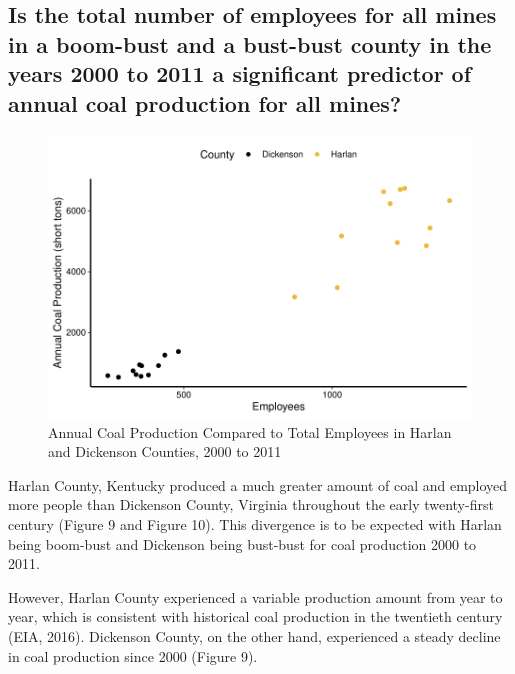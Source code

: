 \documentclass[12pt,]{article}
\begin{document}
\hypertarget{is-the-total-number-of-employees-for-all-mines-in-a-boom-bust-and-a-bust-bust-county-in-the-years-2000-to-2011-a-significant-predictor-of-annual-coal-production-for-all-mines}{%
\subsection{Is the total number of employees for all mines in a
boom-bust and a bust-bust county in the years 2000 to 2011 a significant
predictor of annual coal production for all
mines?}\label{is-the-total-number-of-employees-for-all-mines-in-a-boom-bust-and-a-bust-bust-county-in-the-years-2000-to-2011-a-significant-predictor-of-annual-coal-production-for-all-mines}}

\begin{figure}
\centering
\includegraphics{Smith_ENV872_Project_files/figure-latex/unnamed-chunk-16-1.pdf}
\caption{\label{fig:figs} Annual Coal Production Compared to Total
Employees in Harlan and Dickenson Counties, 2000 to 2011}
\end{figure}

Harlan County, Kentucky produced a much greater amount of coal and
employed more people than Dickenson County, Virginia throughout the
early twenty-first century (Figure 9 and Figure 10). This divergence is
to be expected with Harlan being boom-bust and Dickenson being bust-bust
for coal production 2000 to 2011.

However, Harlan County experienced a variable production amount from
year to year, which is consistent with historical coal production in the
twentieth century (EIA, 2016). Dickenson County, on the other hand,
experienced a steady decline in coal production since 2000 (Figure 9).
\end{document}

